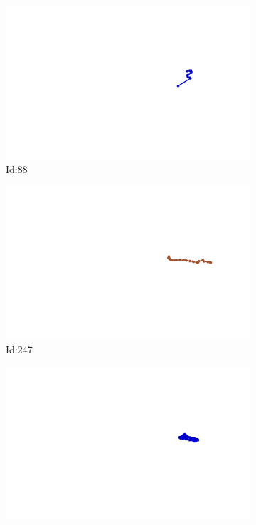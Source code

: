 \documentclass[12pt,twoside]{report}
\begin{document}
\begin{figure}
\centering
\begin{subfigure}[b]{0.20\textwidth}
\centering
\includegraphics[width=\textwidth]{../../trajectories/88.png}
\caption{Id:88}
\end{subfigure}
\begin{subfigure}[b]{0.20\textwidth}
\centering
\includegraphics[width=\textwidth]{../../trajectories/247.png}
\caption{Id:247}
\end{subfigure}
\begin{subfigure}[b]{0.20\textwidth}
\centering
\includegraphics[width=\textwidth]{../../trajectories/368.png}

\end{subfigure}
\end{figure}
\end{document}
